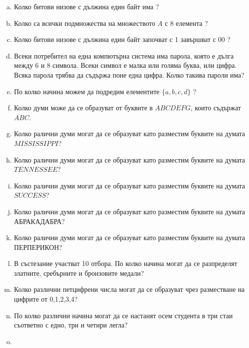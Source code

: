 \begin{problem}
  \begin{enumerate}[a)]
  \item
    Колко битови низове с дължина един байт има ?
  \item
    Колко са всички подмножества на множеството $A$ с $8$ елемента ?
  \item 
    Колко битови низове с дължина един байт започват с 1 завършват с 00 ?
  \item
    Всеки потребител на една компютърна система има парола, която е дълга между 6 и 8 символа.
    Всеки символ е малка или голяма буква, или цифра.
    Всяка парола трябва да съдържа поне една цифра.
    Колко такива пароли има?
  \item
    По колко начина можем да подредим елементите $\{a,b,c,d\}$ ?
  \item 
    Колко думи може да се образуват от буквите в $ABCDEFG$, които съдържат $ABC$.
  \item
    Колко ралични думи могат да се образуват като разместим буквите на думата $MISSISSIPPI$?
  \item
    Колко ралични думи могат да се образуват като разместим буквите на думата $TENNESSEE$?
  \item
    Колко ралични думи могат да се образуват като разместим буквите на думата $SUCCESS$?
  \item
    Колко ралични думи могат да се образуват като разместим буквите на думата АБРАКАДАБРА?
  \item
    Колко ралични думи могат да се образуват като разместим буквите на думата ПЕРПЕРИКОН?
  \item
    В състезание участват 10 отбора. 
    По колко начина могат да се разпределят златните, сребърните и бронзовите медали?
  \item
    Колко различни петцифрени числа могат да се образуват чрез разместване на цифрите от 0,1,2,3,4?
  \item
    По колко различни начина могат да се настанят осем студента в три стаи съответно с едно, три и четири легла?
  \item

\end{enumerate}
\end{problem}
